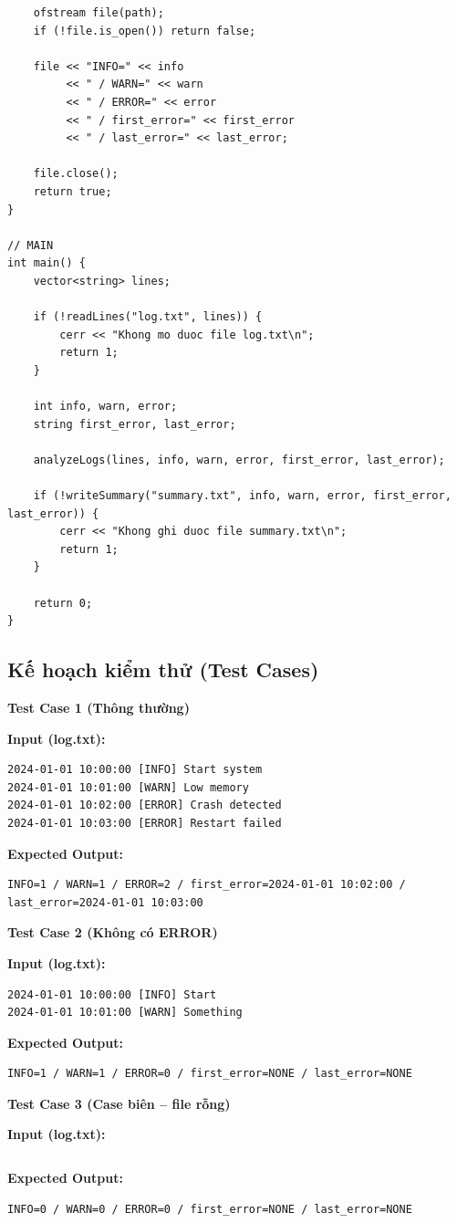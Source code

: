\begin{lstlisting}
    ofstream file(path);
    if (!file.is_open()) return false;

    file << "INFO=" << info
         << " / WARN=" << warn
         << " / ERROR=" << error
         << " / first_error=" << first_error
         << " / last_error=" << last_error;

    file.close();
    return true;
}

// MAIN
int main() {
    vector<string> lines;

    if (!readLines("log.txt", lines)) {
        cerr << "Khong mo duoc file log.txt\n";
        return 1;
    }

    int info, warn, error;
    string first_error, last_error;

    analyzeLogs(lines, info, warn, error, first_error, last_error);

    if (!writeSummary("summary.txt", info, warn, error, first_error, last_error)) {
        cerr << "Khong ghi duoc file summary.txt\n";
        return 1;
    }

    return 0;
}
\end{lstlisting}

\subsection{Kế hoạch kiểm thử (Test Cases)}

\textbf{Test Case 1 (Thông thường)}

\textbf{Input (log.txt):}
\begin{lstlisting}
2024-01-01 10:00:00 [INFO] Start system
2024-01-01 10:01:00 [WARN] Low memory
2024-01-01 10:02:00 [ERROR] Crash detected
2024-01-01 10:03:00 [ERROR] Restart failed
\end{lstlisting}

\textbf{Expected Output:}
\begin{lstlisting}
INFO=1 / WARN=1 / ERROR=2 / first_error=2024-01-01 10:02:00 / last_error=2024-01-01 10:03:00
\end{lstlisting}

\vspace{0.5cm}

\textbf{Test Case 2 (Không có ERROR)}

\textbf{Input (log.txt):}
\begin{lstlisting}
2024-01-01 10:00:00 [INFO] Start
2024-01-01 10:01:00 [WARN] Something
\end{lstlisting}

\textbf{Expected Output:}
\begin{lstlisting}
INFO=1 / WARN=1 / ERROR=0 / first_error=NONE / last_error=NONE
\end{lstlisting}

\vspace{0.5cm}

\textbf{Test Case 3 (Case biên -- file rỗng)}

\textbf{Input (log.txt):}
\begin{lstlisting}
\end{lstlisting}

\textbf{Expected Output:}
\begin{lstlisting}
INFO=0 / WARN=0 / ERROR=0 / first_error=NONE / last_error=NONE
\end{lstlisting}